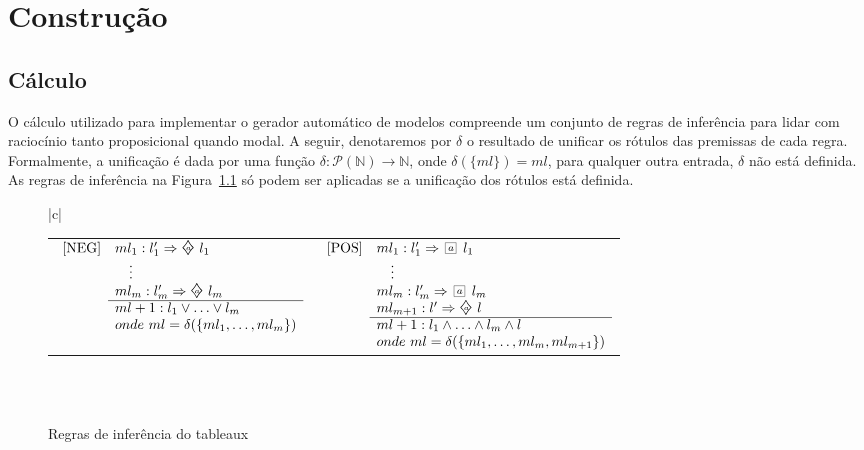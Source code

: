 \chapter{Construção}
\label{cap:construcao}

\section{Cálculo}
\label{sec:calc}
O cálculo utilizado para implementar o gerador automático de modelos compreende
um conjunto de regras de inferência para lidar com raciocínio tanto
proposicional quando modal. A seguir, denotaremos por $\delta$ o
resultado de unificar os rótulos das premissas de cada regra. Formalmente,
a unificação é dada por uma função $\delta: \mathscr{P}(\mathbb{N})
\longrightarrow \mathbb{N}$, onde $\delta(\{ml\}) = ml$, para qualquer outra
entrada, $\delta$ não está definida. As regras de inferência na
Figura~\ref{tableaux} só podem ser aplicadas se a unificação dos rótulos está
definida\cite{DBLP:conf/tableaux/NalonHD15}.

\begin{figure}[!tbh]
    \centering
    {\footnotesize
        \begin{tabular}{|c|}
            \hline
            \\
            \begin{tabular}{cc}
                $
                \begin{array}{cll}
                    \mbox{[NEG]} &ml_1: l_1 ' \then \pos{a}~ l_1 \\ 
                                  &\ ~\ \vdots \\
                                  &ml_m: l_m ' \then \pos{a}~ l_m\\ \cline{2-2}
                                  & ml+1: l_1 \vee \ldots \vee l_m \\
                                  & onde\ ml = \delta(\{ml_1,\ldots, ml_m\})
                \end{array}
                $
                &
                $
                \begin{array}{cll}
                    \mbox{[POS]} &ml_1: l_1 ' \then \nec{a}~ l_1 \\ 
                                  &\ ~\ \vdots \\
                                  &ml_m: l_m ' \then \nec{a}~ l_m\\ 
                                  &ml_{m+1}: l' \then \pos{a}~ l \\ \cline{2-2}
                                  & ml+1: l_1 \wedge \ldots \wedge l_m \wedge l \\
                                  & onde\ ml = \delta(\{ml_1,\ldots, ml_m,
                ml_{m+1}\})
                \end{array}
                $
            \end{tabular}
            \\
            \\
            \hline
    \end{tabular}}
            \caption{Regras de inferência do tableaux}
            \label{tableaux}
        \end{figure}


